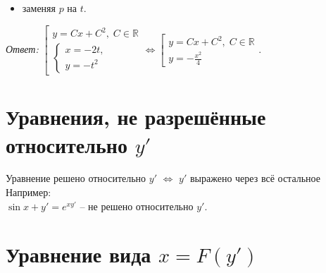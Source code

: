 \documentclass[10pt, a4paper]{article}
\begin{document}
\begin{enumerate}
\begin{itemize}
            \item заменяя $p$ на $t$.
        \end{itemize}
        \par\textit{Ответ:}
            $\left[
              \begin{gathered}
                  y = Cx + C^2, \; C \in \mathbb{R} \\
                  \begin{cases}
                      x = -2t, \\
                      y = -t^2
                  \end{cases}
              \end{gathered}
          \right.
          \Leftrightarrow
          \left[
              \begin{gathered}
                  y = Cx + C^2, \; C \in \mathbb{R} \\
                  y = -\frac{x^2}{4}
              \end{gathered}
          \right.$.
\end{enumerate}


\section*{Уравнения, не разрешённые относительно $y'$}
Уравнение решено относительно $y'$ $\Leftrightarrow$ $y'$ выражено через всё остальное \\
Например: \\
$\sin{x + y'} = e^{xy'}$ -- не решено относительно $y'$.

\section{Уравнение вида $x = F(y')$}
\end{document}
